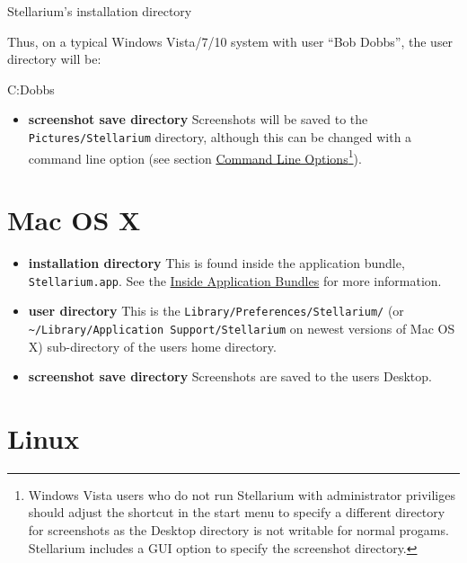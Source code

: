 \begin{commands}
Stellarium's installation directory
\end{commands}


Thus, on a typical Windows Vista/7/10 system with user ``Bob
Dobbs'', the user directory will be:

\begin{commands}
C:\Users\Bob Dobbs\AppData\Roaming\Stellarium\
\end{commands}



\begin{itemize}
\item
  \textbf{screenshot save directory} Screenshots will be saved to the
  \texttt{Pictures/Stellarium} directory, although this can be changed with a command line option (see
  section \href{Advanced_Use\#Command_Line_Options}{Command Line
  Options}\footnote{Windows Vista users who do not run Stellarium with
    administrator priviliges should adjust the shortcut in the start
    menu to specify a different directory for screenshots as the Desktop
    directory is not writable for normal progams. 
    Stellarium includes a GUI option to specify the screenshot
    directory.}).
\end{itemize}

\section{Mac OS X}\label{mac-os-x}
\label{sec:FilesAndDirectories:MacOSX}

\begin{itemize}
\item
  \textbf{installation directory} This is found inside the application
  bundle, \texttt{Stellarium.app}. See the
  \href{http://www.mactipsandtricks.com/articles/Wiley_HT_appBundles.lasso}{Inside
  Application Bundles} for more information.
\item
  \textbf{user directory} This is the
  \texttt{Library/Preferences/Stellarium/} (or
  \texttt{\textasciitilde{}/Library/Application\ Support/Stellarium} on
  newest versions of Mac OS X) sub-directory of the users home
  directory.
\item
  \textbf{screenshot save directory} Screenshots are saved to the users
  Desktop.
\end{itemize}

\section{Linux}\label{linux}
\label{sec:FilesAndDirectories:Linux}

